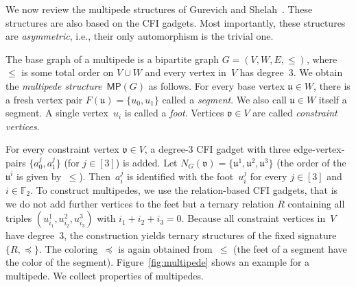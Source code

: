 \documentclass[]{lmcs}
\newcommand{\FF}{\mathbb{F}}
\newcommand{\defining}[1]{\emph{#1}}
\newcommand{\set}[1]{\lbrace #1 \rbrace}
\newcommand{\vertA}{u}
\newcommand{\spleq}{\preceq}
\newcommand{\neighbors}[2]{N_{#1}(#2)}
\newcommand{\bVertA}{\mathfrak{u}}
\newcommand{\bVertB}{\mathfrak{v}}
\newcommand{\multipede}[1]{\mathsf{MP}(#1)}
\newcommand{\gadgetsb}{V}
\newcommand{\feetb}{W}
\newcommand{\feetOf}[1]{F(#1)}
\begin{document}
We now review the multipede structures of Gurevich and Shelah~\cite{GurevichShelah96}.
These structures are also based on the CFI gadgets.
Most importantly, these structures are \defining{asymmetric}, i.e.,
their only automorphism is the trivial one.

The base graph of a multipede is a bipartite graph $G=(\gadgetsb,\feetb,E, \leq)$,
where~$\leq$ is some total order on $\gadgetsb \cup \feetb$ and every vertex in~$\gadgetsb$ has degree~$3$.
We obtain the  \defining{multipede structure}~$\multipede{G}$ as follows.
For every base vertex $\bVertA \in \feetb$, there is a fresh vertex pair ${\feetOf{\bVertA} = \set{\vertA_0,\vertA_1}}$
called a \defining{segment}. 
We also call $\bVertA\in \feetb$ itself a segment.
A single vertex~$\vertA_i$ is called a \defining{foot}.
Vertices $\bVertB \in \gadgetsb$ are called \defining{constraint vertices}.

For every constraint vertex $\bVertB \in \gadgetsb$,
a degree-$3$ CFI gadget with three edge-vertex-pairs $\set{a_0^j,a_1^j}$ (for $j \in [3]$) is added.
Let $\neighbors{G}{\bVertB} = \set{\bVertA^1,\bVertA^2,\bVertA^3}$
(the order of the~$\bVertA^i$ is given by~$\leq$).
Then~$a_i^j$ is identified with the foot~$\vertA^j_i$ for every $j \in [3]$ and $i \in \FF_2$.
To construct multipedes, we use the relation-based CFI gadgets,
that is we do not add further vertices to the feet
but a ternary relation $R$ containing all triples $(\vertA_{i_1}^1,\vertA_{i_2}^2,\vertA_{i_3}^3)$ with $i_1+i_2+i_3 = 0$.
Because all constraint vertices in~$\gadgetsb$ have degree~$3$,
the construction yields ternary structures of the fixed signature $\set{R, \spleq}$.
The coloring~$\spleq$ is again obtained from~$\leq$
(the feet of a segment have the color of the segment).
Figure~\ref{fig:multipede} shows an example for a multipede.
We collect properties of multipedes.
\end{document}
